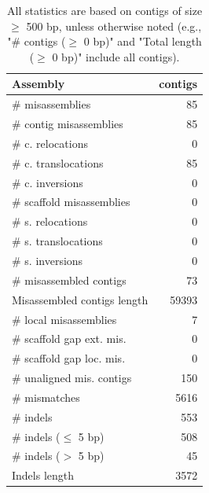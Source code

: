 \documentclass[12pt,a4paper]{article}
\begin{document}
\begin{table}[ht]
\begin{center}
\caption{All statistics are based on contigs of size $\geq$ 500 bp, unless otherwise noted (e.g., "\# contigs ($\geq$ 0 bp)" and "Total length ($\geq$ 0 bp)" include all contigs).}
\begin{tabular}{|l*{1}{|r}|}
\hline
Assembly & contigs \\ \hline
\# misassemblies & 85 \\ \hline
\hspace{2mm}\# contig misassemblies & 85 \\ \hline
\hspace{5mm}\# c. relocations & 0 \\ \hline
\hspace{5mm}\# c. translocations & 85 \\ \hline
\hspace{5mm}\# c. inversions & 0 \\ \hline
\hspace{2mm}\# scaffold misassemblies & 0 \\ \hline
\hspace{5mm}\# s. relocations & 0 \\ \hline
\hspace{5mm}\# s. translocations & 0 \\ \hline
\hspace{5mm}\# s. inversions & 0 \\ \hline
\# misassembled contigs & 73 \\ \hline
Misassembled contigs length & 59393 \\ \hline
\# local misassemblies & 7 \\ \hline
\# scaffold gap ext. mis. & 0 \\ \hline
\# scaffold gap loc. mis. & 0 \\ \hline
\# unaligned mis. contigs & 150 \\ \hline
\# mismatches & 5616 \\ \hline
\# indels & 553 \\ \hline
\hspace{5mm}\# indels ($\leq$ 5 bp) & 508 \\ \hline
\hspace{5mm}\# indels ($>$ 5 bp) & 45 \\ \hline
Indels length & 3572 \\ \hline
\end{tabular}
\end{center}
\end{table}
\end{document}
